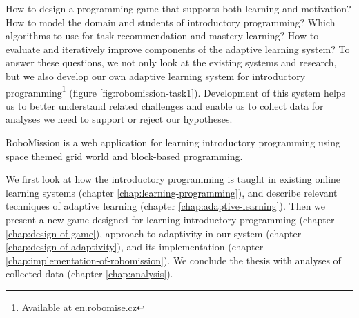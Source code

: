 How to design a programming game that supports both learning and motivation?
How to model the domain and students of introductory programming?
Which algorithms to use for task recommendation and mastery learning?
How to evaluate and iteratively improve components of the adaptive learning system?
To answer these questions, we not only look at the existing systems
and research, but we also develop our own adaptive learning system for
introductory programming\footnote{Available at \url{en.robomise.cz}}
(figure \ref{fig:robomission-task1}).
Development of this system helps us to better understand related challenges
and enable us to collect data for analyses we need to support or reject our hypotheses.

%
  {RoboMission is a web application for learning introductory programming %
   using space themed grid world and block-based programming.}

We first look at how the introductory programming is taught
in existing online learning systems
(chapter \ref{chap:learning-programming}),
and describe relevant techniques of adaptive learning
(chapter \ref{chap:adaptive-learning}).
Then we present a new game designed for learning introductory programming
(chapter \ref{chap:design-of-game}),
approach to adaptivity in our system (chapter \ref{chap:design-of-adaptivity}),
and its implementation (chapter \ref{chap:implementation-of-robomission}).
We conclude the thesis with analyses of collected data
(chapter \ref{chap:analysis}).
